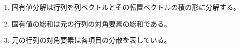 \begin{enumerate}
	\item 固有値分解は行列を列ベクトルとその転置ベクトルの積の形に分解する。
	\item 固有値の総和は元の行列の対角要素の総和である。
	\item 元の行列の対角要素は各項目の分散を表している。
\end{enumerate}

